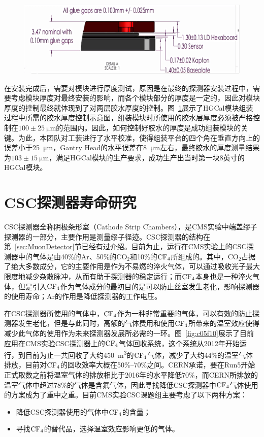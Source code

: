 \begin{figure}[!htbp]
    \centering
    \includegraphics[width=1.0\textwidth]{figures/chapter05/glue.png}
    \label{fig:c05f09}
\end{figure}

在安装完成后，需要对模块进行厚度测试，原因是在最终的探测器安装过程中，需要考虑模块厚度对最终安装的影响，而各个模块部分的厚度是一定的，因此对模块厚度的控制最终就体现到了对两层胶水厚度的控制。图~\ref{fig:c05f09}展示了HGCal模块组装过程中所需的胶水厚度控制示意图，组装模块时所使用的胶水层厚度必须被严格控制在$100\pm25~\si{\um}$的范围内。因此，如何控制好胶水的厚度是成功组装模块的关键。为此，本团队对工装进行了水平校准，使得组装平台的四个角在垂直方向上的误差小于25~\si{\um}，Gantry Head的水平误差在8~\si{\um}左右，最终胶水的厚度测量结果为$103\pm15~\si{\um}$，满足HGCal模块的生产要求，成功生产出当时第一块8英寸的HGCal模块。

\section{CSC探测器寿命研究}

CSC探测器全称阴极条形室（Cathode Strip Chambers），是CMS实验中端盖缪子探测器的一部分，主要作用是测量缪子径迹。CSC探测器的结构在第~\ref{sec:MuonDetector}节已经有过介绍。目前为止，运行在CMS实验上的CSC探测器中的气体是由40\%的$\mathrm{Ar}$、50\%的$\mathrm{CO_2}$和10\%的$\mathrm{CF_4}$所组成的。其中，$\mathrm{CO_2}$占据了绝大多数成分，它的主要作用是作为不易燃的淬火气体，可以通过吸收光子最大限度地减少杂散脉冲，从而有助于探测器的稳定运行；而$\mathrm{CF_4}$本身也是一种淬火气体，但是引入$\mathrm{CF_4}$作为气体成分的最初目的是可以防止丝室发生老化，影响探测器的使用寿命；$\mathrm{Ar}$的作用是降低探测器的工作电压。

在CSC探测器所使用的气体中，$\mathrm{CF_4}$作为一种非常重要的气体，可以有效的防止探测器发生老化，但是与此同时，高额的气体费用和使用$\mathrm{CF_4}$所带来的温室效应使得减少此气体的使用作为未来探测器发展所必需的一环。图~\ref{fig:c05f10}展示了目前应用在CMS实验CSC探测器上的$\mathrm{CF_4}$气体回收系统，这个系统从2012年开始运行，到目前为止一共回收了大约450~\si{\m^{3}}的$\mathrm{CF_4}$气体，减少了大约44\%的温室气体排放，目前对$\mathrm{CF_4}$的回收效率大概在50\%--70\%之间。CERN承诺，要在Run5开始正式取数之前将温室气体的排放相比于2016年的水平降低70\%，而CERN所排放的温室气体中超过78\%的气体是含氟气体，因此寻找降低CSC探测器中$\mathrm{CF_4}$气体使用的方案成为了重中之重。目前CMS实验CSC课题组主要考虑了以下两种方案：
\begin{itemize}
    \item 降低CSC探测器使用的气体中$\mathrm{CF_4}$的含量；
    \item 寻找$\mathrm{CF_4}$的替代品，选择温室效应影响更低的气体。
\end{itemize}

